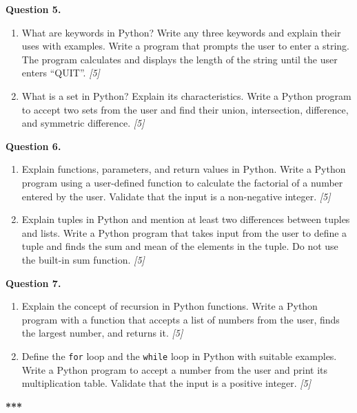 \documentclass[11pt,a4paper]{article}
\newcommand{\pts}[1]{\hfill \textit{[#1]}}
\begin{document}
\bigskip

\noindent \textbf{Question 5.}
\begin{enumerate}[label=(\alph*)]
  \item What are keywords in Python? Write any three keywords and explain their uses with examples. Write a program that prompts the user to enter a string. The program calculates and displays the length of the string until the user enters ``QUIT''. \pts{5}
  \item What is a set in Python? Explain its characteristics. Write a Python program to accept two sets from the user and find their union, intersection, difference, and symmetric difference. \pts{5}
\end{enumerate}

\bigskip

\noindent \textbf{Question 6.}
\begin{enumerate}[label=(\alph*)]
  \item Explain functions, parameters, and return values in Python. Write a Python program using a user-defined function to calculate the factorial of a number entered by the user. Validate that the input is a non-negative integer. \pts{5}
  \item Explain tuples in Python and mention at least two differences between tuples and lists. Write a Python program that takes input from the user to define a tuple and finds the sum and mean of the elements in the tuple. Do not use the built-in sum function. \pts{5}
\end{enumerate}

\bigskip

\noindent \textbf{Question 7.}
\begin{enumerate}[label=(\alph*)]
  \item Explain the concept of recursion in Python functions. Write a Python program with a function that accepts a list of numbers from the user, finds the largest number, and returns it. \pts{5}
  \item Define the \texttt{for} loop and the \texttt{while} loop in Python with suitable examples. Write a Python program to accept a number from the user and print its multiplication table. Validate that the input is a positive integer. \pts{5}
\end{enumerate}

\bigskip
\begin{center}
  \textbf{***}
\end{center}
\end{document}
